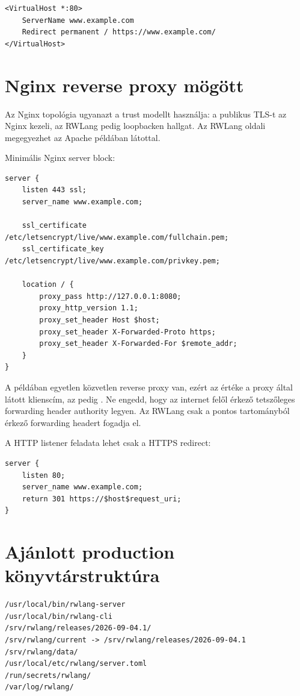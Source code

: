 \begin{lstlisting}
<VirtualHost *:80>
    ServerName www.example.com
    Redirect permanent / https://www.example.com/
</VirtualHost>
\end{lstlisting}

\section{Nginx reverse proxy mögött}

Az Nginx topológia ugyanazt a trust modellt használja: a publikus TLS-t az Nginx kezeli, az RWLang pedig loopbacken hallgat. Az RWLang oldali  megegyezhet az Apache példában látottal.

Minimális Nginx server block:

\begin{lstlisting}
server {
    listen 443 ssl;
    server_name www.example.com;

    ssl_certificate     /etc/letsencrypt/live/www.example.com/fullchain.pem;
    ssl_certificate_key /etc/letsencrypt/live/www.example.com/privkey.pem;

    location / {
        proxy_pass http://127.0.0.1:8080;
        proxy_http_version 1.1;
        proxy_set_header Host $host;
        proxy_set_header X-Forwarded-Proto https;
        proxy_set_header X-Forwarded-For $remote_addr;
    }
}
\end{lstlisting}

A példában egyetlen közvetlen reverse proxy van, ezért az  értéke a proxy által látott klienscím, az  pedig . Ne engedd, hogy az internet felől érkező tetszőleges forwarding header authority legyen. Az RWLang csak a pontos  tartományból érkező forwarding headert fogadja el.

A HTTP listener feladata lehet csak a HTTPS redirect:

\begin{lstlisting}
server {
    listen 80;
    server_name www.example.com;
    return 301 https://$host$request_uri;
}
\end{lstlisting}

\section{Ajánlott production könyvtárstruktúra}

\begin{lstlisting}
/usr/local/bin/rwlang-server
/usr/local/bin/rwlang-cli
/srv/rwlang/releases/2026-09-04.1/
/srv/rwlang/current -> /srv/rwlang/releases/2026-09-04.1
/srv/rwlang/data/
/usr/local/etc/rwlang/server.toml
/run/secrets/rwlang/
/var/log/rwlang/
\end{lstlisting}

